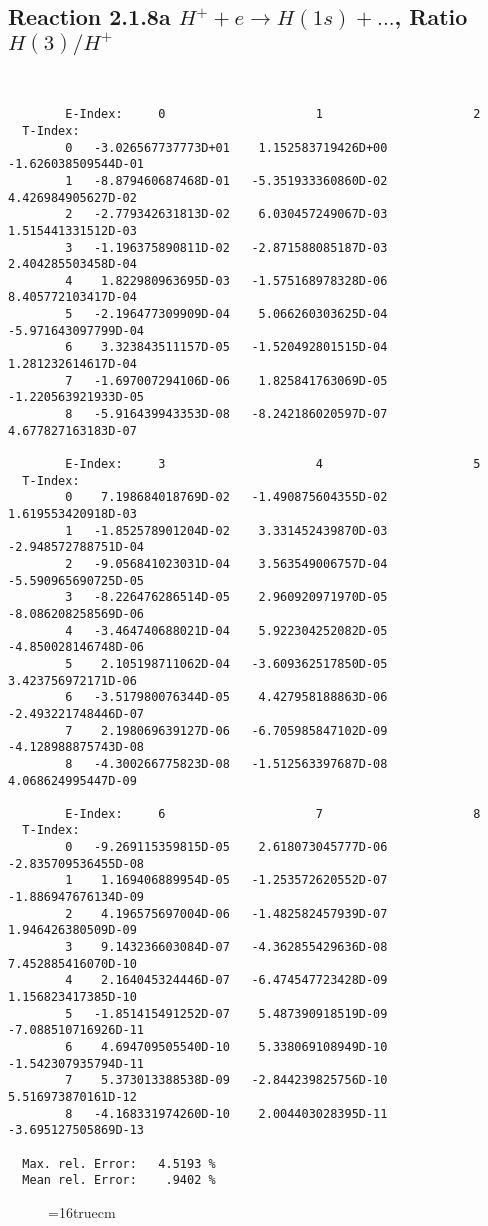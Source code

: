 \documentclass[12pt]{article}
\begin{document}
\subsection{
Reaction 2.1.8a  $H^+ + e \rightarrow H(1s) + ...$,  Ratio $H(3)/H^+$
}

\begin{small}\begin{verbatim}


        E-Index:     0                     1                     2
  T-Index:
        0   -3.026567737773D+01    1.152583719426D+00   -1.626038509544D-01
        1   -8.879460687468D-01   -5.351933360860D-02    4.426984905627D-02
        2   -2.779342631813D-02    6.030457249067D-03    1.515441331512D-03
        3   -1.196375890811D-02   -2.871588085187D-03    2.404285503458D-04
        4    1.822980963695D-03   -1.575168978328D-06    8.405772103417D-04
        5   -2.196477309909D-04    5.066260303625D-04   -5.971643097799D-04
        6    3.323843511157D-05   -1.520492801515D-04    1.281232614617D-04
        7   -1.697007294106D-06    1.825841763069D-05   -1.220563921933D-05
        8   -5.916439943353D-08   -8.242186020597D-07    4.677827163183D-07

        E-Index:     3                     4                     5
  T-Index:
        0    7.198684018769D-02   -1.490875604355D-02    1.619553420918D-03
        1   -1.852578901204D-02    3.331452439870D-03   -2.948572788751D-04
        2   -9.056841023031D-04    3.563549006757D-04   -5.590965690725D-05
        3   -8.226476286514D-05    2.960920971970D-05   -8.086208258569D-06
        4   -3.464740688021D-04    5.922304252082D-05   -4.850028146748D-06
        5    2.105198711062D-04   -3.609362517850D-05    3.423756972171D-06
        6   -3.517980076344D-05    4.427958188863D-06   -2.493221748446D-07
        7    2.198069639127D-06   -6.705985847102D-09   -4.128988875743D-08
        8   -4.300266775823D-08   -1.512563397687D-08    4.068624995447D-09

        E-Index:     6                     7                     8
  T-Index:
        0   -9.269115359815D-05    2.618073045777D-06   -2.835709536455D-08
        1    1.169406889954D-05   -1.253572620552D-07   -1.886947676134D-09
        2    4.196575697004D-06   -1.482582457939D-07    1.946426380509D-09
        3    9.143236603084D-07   -4.362855429636D-08    7.452885416070D-10
        4    2.164045324446D-07   -6.474547723428D-09    1.156823417385D-10
        5   -1.851415491252D-07    5.487390918519D-09   -7.088510716926D-11
        6    4.694709505540D-10    5.338069108949D-10   -1.542307935794D-11
        7    5.373013388538D-09   -2.844239825756D-10    5.516973870161D-12
        8   -4.168331974260D-10    2.004403028395D-11   -3.695127505869D-13

  Max. rel. Error:   4.5193 %
  Mean rel. Error:    .9402 %

\end{verbatim}\end{small}
\begin{figure} \label{2.1.8ra}
\epsfxsize=16truecm
\end{figure}
\newpage
\end{document}
